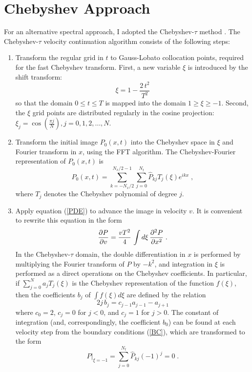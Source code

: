 \section{Chebyshev Approach}
For an alternative spectral approach, I adopted the Chebyshev-$\tau$
method \cite[]{lanc,orszag}. The Chebyshev-$\tau$ velocity continuation
algorithm consists of the following steps:
\begin{enumerate}
\item Transform the regular grid in $t$ to Gauss-Lobato collocation
  points, required for the fast Chebyshev transform.  First, a new
  variable $\xi$ is introduced by the shift transform:
  \begin{equation}
    \label{t2x}
    \xi = 1 - \frac{2\,t^2}{T^2}
  \end{equation}
  so that the domain $0 \leq t \leq T$ is mapped into the domain $1
  \geq \xi \geq -1$. Second, the $\xi$ grid points are distributed
  regularly in the cosine projection: $\xi_j = \cos(\frac{\pi j}{N}), j
  = 0,1,2,\ldots,N$.
\item Transform the initial image $P_0 (x,t)$ into the Chebyshev space
  in $\xi$ and Fourier transform in $x$, using the FFT algorithm. The
  Chebyshev-Fourier representation of $P_0 (x,t)$ is
  \begin{equation}
    \label{cheb}
    P_0 (x,t) = \sum_{k=-N_x/2}^{N_x/2-1}\sum_{j=0}^{N_t} 
    \hat{P}_{kj} T_j (\xi) e^{i k x}\;, 
  \end{equation}
  where $T_j$ denotes the Chebyshev polynomial of degree $j$.
\item Apply equation (\ref{PDE}) to advance the image in velocity $v$.
  It is convenient to rewrite this equation in the form
  \begin{equation}
    \label{chebPDE}
  {{\partial P} \over {\partial v}} =
  \frac{v T^2}{4}\,\int d\xi\,
  {{\partial^2 P} \over {\partial x^2}}\;. 
  \end{equation}
  In the Chebyshev-$\tau$ domain, the double differentiation in $x$ is
  performed by multiplying the Fourier transform of $P$ by $-k^2$, and
  integration in $\xi$ is performed
  as a direct operations on the Chebyshev coefficients. In
  particular, if $\sum_{j=0}^{N} a_j T_j (\xi)$ is the Chebyshev
  representation of the function $f (\xi)$, then the coefficients
  $b_j$ of $\int f (\xi) d\xi$ are defined by the relation
  \begin{equation}
    \label{int}
    2 j\,b_j = c_{j-1} a_{j-1} - a_{j+1}
  \end{equation}
  where $c_0 = 2$, $c_j = 0$ for $j < 0$, and $c_j = 1$ for $j > 0$.
  The constant of integration (and, correspondingly, the coefficient
  $b_0$) can be found at each velocity step from the boundary
  conditions (\ref{BC}), which are transformed to the form
  \begin{equation}
    \label{chebBC}
    \left.P\right|_{\xi=-1} = \sum_{j=0}^{N_t} \hat{P}_{kj} (-1)^j = 0\;.
  \end{equation}
  

\end{enumerate}
